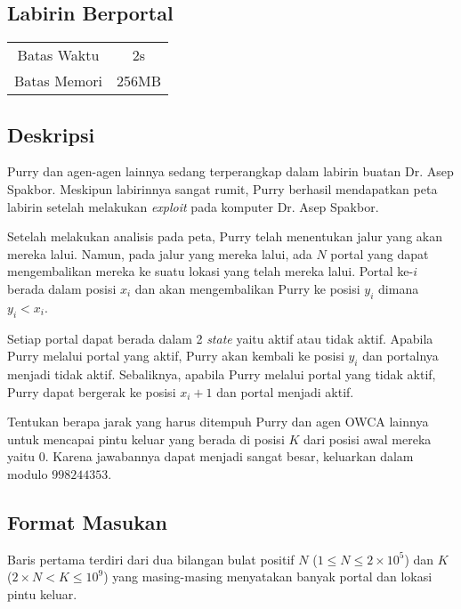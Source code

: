 \documentclass{article}
\begin{document}
\begin{center}

    
    \section*{Labirin Berportal} %

    \begin{tabular}{ | c c | }
        \hline
        Batas Waktu  & 2s \\    %
        Batas Memori & 256MB \\  %
        \hline
    \end{tabular}
\end{center}

\subsection*{Deskripsi}

Purry dan agen-agen lainnya sedang terperangkap dalam labirin buatan Dr. Asep Spakbor. Meskipun labirinnya sangat rumit, Purry berhasil mendapatkan peta labirin setelah melakukan \textit{exploit} pada komputer Dr. Asep Spakbor. 

Setelah melakukan analisis pada peta, Purry telah menentukan jalur yang akan mereka lalui. Namun, pada jalur yang mereka lalui, ada $N$ portal yang dapat mengembalikan mereka ke suatu lokasi yang telah mereka lalui. Portal ke-$i$ berada dalam posisi $x_i$ dan akan mengembalikan Purry ke posisi $y_i$ dimana $y_i < x_i$.

Setiap portal dapat berada dalam 2 \textit{state} yaitu aktif atau tidak aktif. Apabila Purry melalui portal yang aktif, Purry akan kembali ke posisi $y_i$ dan portalnya menjadi tidak aktif. Sebaliknya, apabila Purry melalui portal yang tidak aktif, Purry dapat bergerak ke posisi $x_i + 1$ dan portal menjadi aktif.

Tentukan berapa jarak yang harus ditempuh Purry dan agen OWCA lainnya untuk mencapai pintu keluar yang berada di posisi $K$ dari posisi awal mereka yaitu $0$. Karena jawabannya dapat menjadi sangat besar, keluarkan dalam modulo $998244353$.

\subsection*{Format Masukan}

Baris pertama terdiri dari dua bilangan bulat positif $N$ ($1 \leq N \leq 2 \times 10^{5}$) dan $K$ ($2 \times N < K \leq 10^{9}$) yang masing-masing menyatakan banyak portal dan lokasi pintu keluar.
\end{document}
